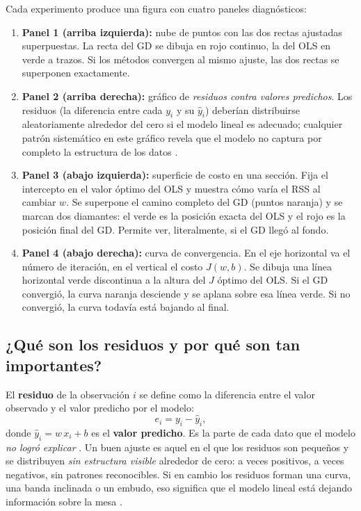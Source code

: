 \documentclass[11pt,a4paper]{article}
\begin{document}
Cada experimento produce una figura con cuatro paneles diagnósticos:

\begin{enumerate}
    \item \textbf{Panel 1 (arriba izquierda):} nube de puntos con las dos rectas ajustadas superpuestas. La recta del GD se dibuja en rojo continuo, la del OLS en verde a trazos. Si los métodos convergen al mismo ajuste, las dos rectas se superponen exactamente.
    \item \textbf{Panel 2 (arriba derecha):} gráfico de \textit{residuos contra valores predichos}. Los residuos (la diferencia entre cada $y_i$ y su $\hat{y}_i$) deberían distribuirse aleatoriamente alrededor del cero si el modelo lineal es adecuado; cualquier patrón sistemático en este gráfico revela que el modelo no captura por completo la estructura de los datos \cite{fastercapital_residuos,maxima_residuos,hernandez_diag}.
    \item \textbf{Panel 3 (abajo izquierda):} superficie de costo en una sección. Fija el intercepto en el valor óptimo del OLS y muestra cómo varía el RSS al cambiar $w$. Se superpone el camino completo del GD (puntos naranja) y se marcan dos diamantes: el verde es la posición exacta del OLS y el rojo es la posición final del GD. Permite ver, literalmente, si el GD llegó al fondo.
    \item \textbf{Panel 4 (abajo derecha):} curva de convergencia. En el eje horizontal va el número de iteración, en el vertical el costo $J(w,b)$. Se dibuja una línea horizontal verde discontinua a la altura del $J$ óptimo del OLS. Si el GD convergió, la curva naranja desciende y se aplana sobre esa línea verde. Si no convergió, la curva todavía está bajando al final.
\end{enumerate}

\subsection{¿Qué son los residuos y por qué son tan importantes?}

El \textbf{residuo} de la observación $i$ se define como la diferencia entre el valor observado y el valor predicho por el modelo:
\begin{equation}
e_i = y_i - \hat{y}_i,
\end{equation}
donde $\hat{y}_i = w\,x_i + b$ es el \textbf{valor predicho}. Es la parte de cada dato que el modelo \textit{no logró explicar} \cite{fastercapital_residuos,maxima_residuos,unican_regresion}. Un buen ajuste es aquel en el que los residuos son pequeños y se distribuyen \textit{sin estructura visible} alrededor de cero: a veces positivos, a veces negativos, sin patrones reconocibles. Si en cambio los residuos forman una curva, una banda inclinada o un embudo, eso significa que el modelo lineal está dejando información sobre la mesa \cite{hernandez_diag}.
\end{document}
